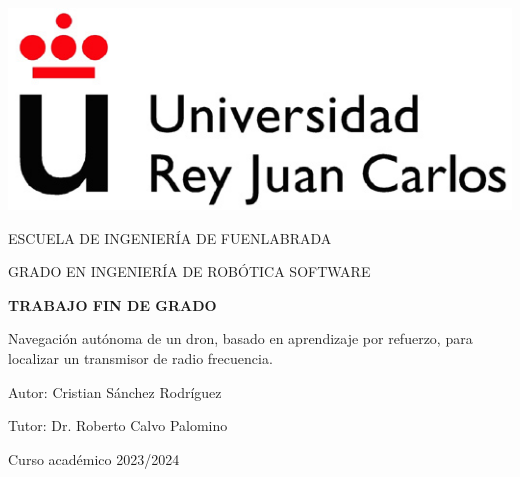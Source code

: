 \thispagestyle{empty}

\begin{titlepage}
	\begin{center}
		\vspace*{3mm}
		\begin{center}
			\includegraphics[width=0.4\linewidth]{imagenes/cap1/logo_urjc}
		\end{center}
		\vspace{6.0mm}
		
		\fontsize{15.5}{14}\selectfont ESCUELA DE INGENIERÍA DE FUENLABRADA
		\vspace{13mm}
		
		\fontsize{14}{14}\selectfont GRADO EN INGENIERÍA DE ROBÓTICA SOFTWARE
		
		\vspace{70pt}
		
		\fontsize{15.7}{14}\selectfont \textbf{TRABAJO FIN DE GRADO} 
		
		\vspace{20mm}
		\begin{LARGE}
			Navegación autónoma de un dron, basado en aprendizaje por refuerzo, para localizar un transmisor de radio frecuencia.
		\end{LARGE}
		
		\vspace{20mm}
		
		\begin{large}
			Autor: Cristian Sánchez Rodríguez
			
			Tutor: Dr. Roberto Calvo Palomino
			
			\vspace{10mm}
		\end{large}
		\begin{normalsize}
			Curso académico 2023/2024		
		\end{normalsize}
		\vspace{10mm}
		
	\end{center}
	
\end{titlepage}

\thispagestyle{empty}
